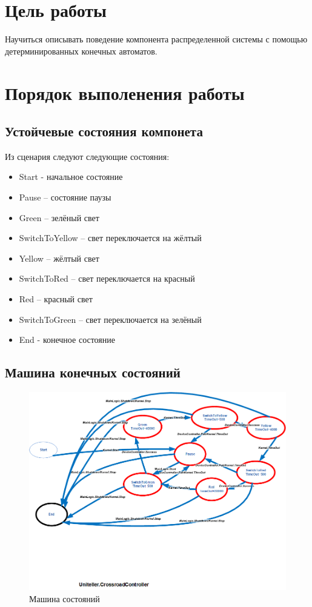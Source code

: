 \section{Цель работы}
	Научиться описывать поведение компонента распределенной системы с помощью детерминированных конечных автоматов.
		
\section{Порядок выполенения работы}
	\subsection{Устойчевые состояния компонета}
	Из сценария следуют следующие состояния:
	\begin{itemize}
		\item Start - начальное состояние
		\item Pause – состояние паузы
		\item Green – зелёный свет
		\item SwitchToYellow – свет переключается на жёлтый
		\item Yellow – жёлтый свет
		\item SwitchToRed – свет переключается на красный
		\item Red – красный свет
		\item SwitchToGreen – свет переключается на зелёный
		\item End - конечное состояние
	\end{itemize}
		
	\subsection{Машина конечных состояний}
	
		\begin{figure}[h]
			\centering
			\includegraphics[width=\linewidth]{images/statemachine}
			\caption{Машина состояний}
			\label{fig:statemachine}
		\end{figure}
	
